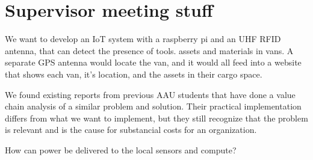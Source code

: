 \section{Supervisor meeting stuff}
We want to develop an IoT system with a raspberry pi and an UHF RFID antenna, that can detect the presence of tools. assets and materials in vans. A separate GPS antenna would locate the van, and it would all feed into a website that shows each van, it's location, and the assets in their cargo space. 

We found existing reports from previous AAU students that have done a value chain analysis of a similar problem and solution. Their practical implementation differs from what we want to implement, but they still recognize that the problem is relevant and is the cause for substancial costs for an organization.

How can power be delivered to the local sensors and compute?
